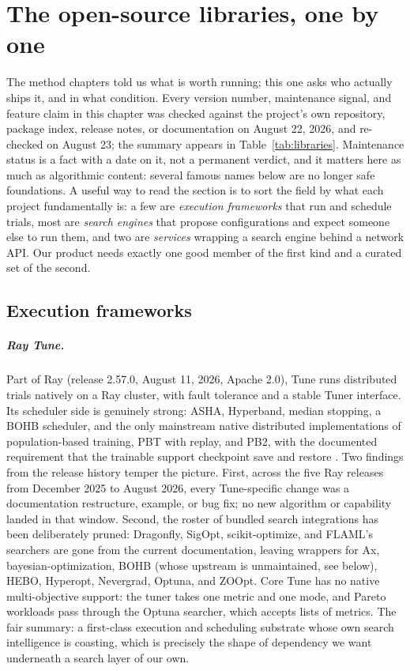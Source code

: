 \chapter{The open-source libraries, one by one}
\label{sec:libraries}

The method chapters told us what is worth running; this one asks who
actually ships it, and in what condition. Every version number,
maintenance signal, and feature claim in this chapter was checked against
the project's own repository, package index, release notes, or
documentation on August 22, 2026, and re-checked on August 23; the
summary appears in Table~\ref{tab:libraries}. Maintenance status is a fact with a date on it,
not a permanent verdict, and it matters here as much as algorithmic content:
several famous names below are no longer safe foundations. A useful way to
read the section is to sort the field by what each project fundamentally is:
a few are \emph{execution frameworks} that run and schedule trials, most are
\emph{search engines} that propose configurations and expect someone else to
run them, and two are \emph{services} wrapping a search engine behind a
network API. Our product needs exactly one good member of the first kind and
a curated set of the second.

\section{Execution frameworks}

\paragraph{Ray Tune.}
Part of Ray (release 2.57.0, August 11, 2026, Apache 2.0), Tune runs
distributed trials natively on a Ray cluster, with fault tolerance and a
stable Tuner interface. Its scheduler side is genuinely strong: ASHA,
Hyperband, median stopping, a BOHB scheduler, and the only mainstream
native distributed implementations of population-based training, PBT with
replay, and PB2, with the documented requirement that the trainable
support checkpoint save and restore \citep{liaw2018tune, moritz2018ray}.
Two findings from the release history temper the picture. First, across
the five Ray releases from December 2025 to August 2026, every
Tune-specific change was a documentation restructure, example, or bug fix;
no new algorithm or capability landed in that window. Second, the roster
of bundled search integrations has been deliberately pruned: Dragonfly,
SigOpt, scikit-optimize, and FLAML's searchers are gone from the current
documentation, leaving wrappers for Ax, bayesian-optimization, BOHB (whose
upstream is unmaintained, see below), HEBO, Hyperopt, Nevergrad, Optuna,
and ZOOpt. Core Tune has no native multi-objective support: the tuner
takes one metric and one mode, and Pareto workloads pass through the
Optuna searcher, which accepts lists of metrics. The fair summary: a
first-class execution and scheduling substrate whose own search
intelligence is coasting, which is precisely the shape of dependency we
want underneath a search layer of our own.

